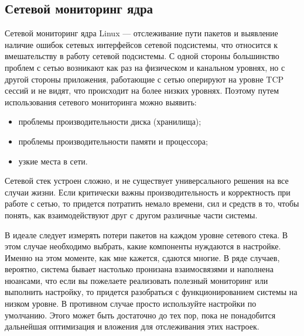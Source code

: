 \subsection{Сетевой мониторинг ядра}

Сетевой мониторинг ядра Linux --- отслеживание пути пакетов и выявление наличие ошибок сетевых интерфейсов сетевой подсистемы, что относится к вмешательству в работу сетевой подсистемы.
С одной стороны большинство проблем с сетью возникают как раз на физическом и канальном уровнях, но с другой стороны приложения, работающие с сетью оперируют на уровне TCP сессий и не видят, что происходит на более низких уровнях.
Поэтому путем использования сетевого мониторинга можно выявить:
\begin{itemize}
	\item проблемы производительности диска (хранилища);
	\item проблемы производительности памяти и процессора;
	\item узкие места в сети.
\end{itemize}

Сетевой стек устроен сложно, и не существует универсального решения на все случаи жизни.
Если  критически важны производительность и корректность при работе с сетью, то придется потратить немало времени, сил и средств в то, чтобы понять, как взаимодействуют друг с другом различные части системы. 

В идеале следует измерять потери пакетов на каждом уровне сетевого стека. 
В этом случае необходимо выбрать, какие компоненты нуждаются в настройке. Именно на этом моменте, как мне кажется, сдаются многие.
В ряде случаев, вероятно, система бывает настолько пронизана взаимосвязями и наполнена нюансами, что если вы пожелаете реализовать полезный мониторинг или выполнить настройку, то придется разобраться с функционированием системы на низком уровне. В противном случае просто используйте настройки по умолчанию. Этого может быть достаточно до тех пор, пока не понадобится дальнейшая оптимизация и вложения для отслеживания этих настроек.

